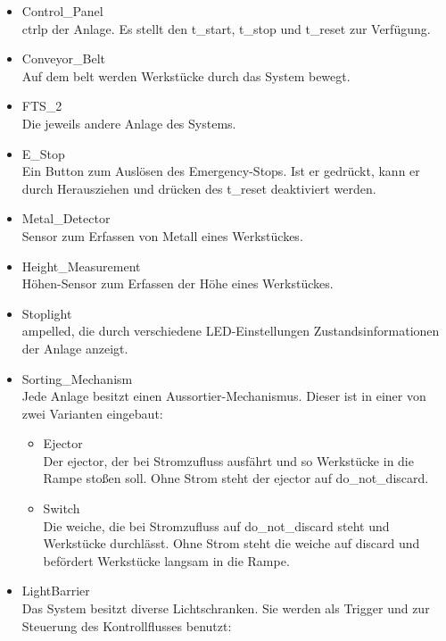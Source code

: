 \begin{itemize}
    \item Control\_Panel\\
    \gls{ctrlp} der Anlage.
    Es stellt den \gls{t_start}, \gls{t_stop} und \gls{t_reset} zur Verfügung.

    \item Conveyor\_Belt\\
    Auf dem \gls{belt} werden Werkstücke durch das System bewegt.
    \item FTS\_2\\
    Die jeweils andere Anlage des Systems.
    \item E\_Stop\\
    Ein Button zum Auslösen des Emergency-Stops. Ist er gedrückt, kann er durch Herausziehen
    und drücken des \gls{t_reset} deaktiviert werden.
    \item Metal\_Detector\\
    Sensor zum Erfassen von Metall eines Werkstückes.
    \item Height\_Measurement\\
    Höhen-Sensor zum Erfassen der Höhe eines Werkstückes.
    \item Stoplight\\
    \gls{ampelled}, die durch verschiedene LED-Einstellungen Zustandsinformationen der Anlage anzeigt.
    \item Sorting\_Mechanism\\
    Jede Anlage besitzt einen Aussortier-Mechanismus.
    Dieser ist in einer von zwei Varianten eingebaut:
    \begin{itemize}
        \item Ejector\\
        Der \gls{ejector}, der bei Stromzufluss ausfährt und so Werkstücke in die Rampe stoßen soll.
        Ohne Strom steht der \gls{ejector} auf \gls{do_not_discard}.
        \item Switch\\
        Die \gls{weiche}, die bei Stromzufluss auf \gls{do_not_discard} steht und Werkstücke durchlässt.
        Ohne Strom steht die  \gls{weiche} auf \gls{discard} und befördert Werkstücke
        langsam in die Rampe.
    \end{itemize}
    \item LightBarrier\\
    Das System besitzt diverse Lichtschranken. Sie werden als Trigger und zur Steuerung
    des Kontrollflusses benutzt:
    \begin{itemize}

\end{itemize}
\end{itemize}
